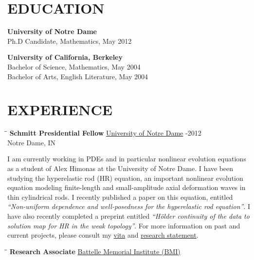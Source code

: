 \documentclass{resume}
\begin{document}
\begin{resume}


	\section{EDUCATION}  \vspace{0.05in}
	\textbf{University of Notre Dame} \\
	Ph.D Candidate, Mathematics, May 2012 

	{\bf \vspace{-0.1in} University of California, Berkeley}\\
	Bachelor of Science, Mathematics, May 2004\\
	Bachelor of Arts, English Literature, May 2004
		 \section{EXPERIENCE}
	\vspace{-0.1in}	
    \begin{tabbing}
		\hspace{2.3in}\= \hspace{2.6in}\= \kill
        {\bf Schmitt Presidential Fellow} \>\href{http://www.nd.edu/}{University
        of Notre Dame}     
		-2012 \\
		\>Notre Dame, IN
	\end{tabbing}\vspace{-15pt}    
I am currently working in PDEs and in particular nonlinear evolution equations
as a student of Alex Himonas at the University of Notre Dame. I have been
studying the hyperelastic rod (HR) equation, an important nonlinear evolution
equation modeling finite-length and small-amplitude axial deformation waves in
thin cylindrical rods. I recently published a paper on this equation, entitled
\textit{``Non-uniform dependence and well-posedness for the hyperelastic rod
equation''}. I have also recently completed a preprint entitled
\textit{``H\"older continuity of the data to solution map for HR in the weak
topology''}. For more information on past and current projects, please consult
my \href{http://davidkarapetyan.com/pdfs/cv.pdf}{vita} and
\href{http://davidkarapetyan.com/pdfs/research-statement.pdf}{research
statement}. 	
	\begin{tabbing}
		\hspace{2.3in}\= \hspace{2.6in}\= \kill
        {\bf Research Associate} \>\href{http://www.battelle.org/}{Battelle
        Memorial Institute (BMI)}     

\end{tabbing}
\end{resume}
\end{document}

